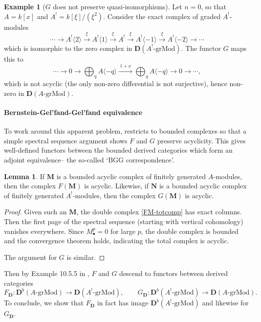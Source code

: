 \documentclass[a4paper]{article}
\theoremstyle{definition}
\newtheorem{lemma}[defn]{Lemma}
\newtheorem{example}[defn]{Example}
\theoremstyle{remark}
\newcommand{\grMod}{\ensuremath{\text{-grMod}}}
\newcommand{\deri}{\mathbf{D}}
\begin{document}
\begin{example}[\(G\) does not preserve quasi-isomorphisms] Let \(n=0\), so that
    \(A=k[x]\) and \({A^!=k[\xi]/(\xi^2)}\). Consider the exact complex of
    graded \(A^!\)-modules 
    \[\cdots \rightarrow A^!\langle 2 \rangle \xrightarrow{\;\xi\;} A^!\langle 1
    \rangle \xrightarrow{\;\xi\;}  A^!\xrightarrow{\;\xi\;} A^!\langle -1 \rangle
    \xrightarrow{\;\xi\;} A^!\langle -2 \rangle \rightarrow \cdots\]
    which is isomorphic to the zero complex in \(\deri(A^!\grMod)\). The functor
    \(G\) maps this to 
    \[\cdots \rightarrow 0 \rightarrow \bigoplus_q A\langle -q \rangle
    \xrightarrow{\;1+x\;} \bigoplus_q A\langle -q \rangle \rightarrow 0
    \rightarrow \cdots, \]
    which is not acyclic (the only non-zero differential is not surjective),
    hence non-zero in \(\deri(A\grMod)\).  
\end{example}

\paragraph{Bernstein-Gel'fand-Gel'fand equivalence} To work around this apparent
problem,  restricts to bounded complexes so
that a simple spectral sequence argument shows \(F\) and \(G\) preserve
acyclicity. This gives well-defined functors between the bounded derived
categories which form an adjoint equivalence-- the so-called `BGG correspondence'.

\begin{lemma}
    If \(\mathbf{M}\) is a bounded acyclic complex of finitely generated
    \(A\)-modules, then the complex \(F(\mathbf{M})\) is acyclic. Likewise, if
    \(\mathbf{N}\) is a bounded acyclic complex of finitely generated
    \(A^!\)-modules, then the complex \(G(\mathbf{M})\) is acyclic.
    \begin{proof}
        Given such an \(\mathbf{M}\), the double complex \eqref{FM-totcomp} has
        exact columns.  Then the first page of the spectral sequence (starting
        with vertical cohomology) vanishes everywhere. Since \(M^p_\bullet = 0\)
        for large \(p\), the double complex is bounded and the convergence
        theorem holds, indicating the total complex is acyclic.
         
        The argument for \(G\) is similar.
    \end{proof}
\end{lemma}

Then by Example 10.5.5 in \cite{weibel_introduction_2003}, \(F\) and
\(G\) descend to functors between derived categories 
\[{F_\deri: \deri^b(A\grMod)\rightarrow \deri(A^!\grMod)}, \qquad G_\deri:
\deri^b(A^!\grMod) \rightarrow \deri(A\grMod).\] 
To conclude, we show that \(F_\deri\) in fact has image \(\deri^b(A^!\grMod)\)
and likewise for \(G_\deri\).
\end{document}
